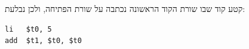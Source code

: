 

קטע קוד שבו שורת הקוד הראשונה נכתבה על שורת הפתיחה, ולכן נבלעת:
\begin{asmblock}
\begin{lstlisting}[style=asm] li   $t0, 5
add  $t1, $t0, $t0
\end{lstlisting}
\end{asmblock}

